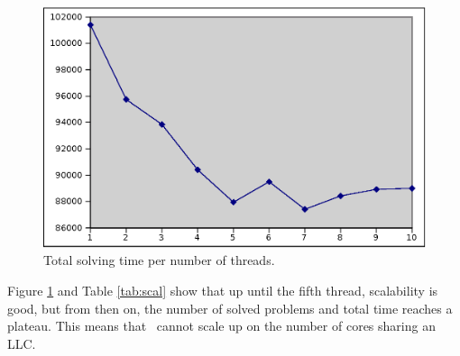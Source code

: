 \begin{figure}[htp]
  \centering
  \includegraphics[scale=1]{plingperthread}
  \caption{Total solving time per number of threads.}
  \label{fig:pperfpthread}
\end{figure}

Figure \ref{fig:pperfpthread} and Table \ref{tab:scal} show that up
until the fifth thread, scalability is good, but from then on, the
number of solved problems and total time reaches a plateau. This means
that \pling\ cannot scale up on the number of cores sharing an LLC. 

